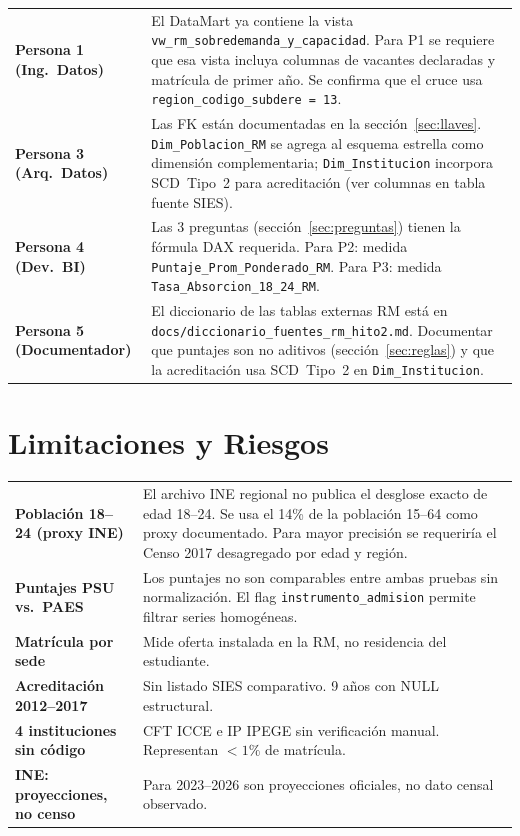 \documentclass[11pt,a4paper]{article}
\begin{document}
\begin{center}
\small
\begin{tabularx}{\textwidth}{@{}>{\bfseries}p{2.8cm}Y@{}}
\toprule
Persona 1 (Ing.\ Datos) &
  El DataMart ya contiene la vista \texttt{vw\_rm\_sobredemanda\_y\_capacidad}.
  Para P1 se requiere que esa vista incluya columnas de vacantes declaradas
  y matrícula de primer año. Se confirma que el cruce usa
  \texttt{region\_codigo\_subdere = 13}. \\
Persona 3 (Arq.\ Datos) &
  Las FK están documentadas en la sección~\ref{sec:llaves}.
  \texttt{Dim\_Poblacion\_RM} se agrega al esquema estrella como dimensión
  complementaria; \texttt{Dim\_Institucion} incorpora SCD~Tipo~2 para
  acreditación (ver columnas en tabla fuente SIES). \\
Persona 4 (Dev.\ BI) &
  Las 3 preguntas (sección~\ref{sec:preguntas}) tienen la fórmula DAX
  requerida. Para P2: medida \texttt{Puntaje\_Prom\_Ponderado\_RM}.
  Para P3: medida \texttt{Tasa\_Absorcion\_18\_24\_RM}. \\
Persona 5 (Documentador) &
  El diccionario de las tablas externas RM está en
  \texttt{docs/diccionario\_fuentes\_rm\_hito2.md}.
  Documentar que puntajes son no aditivos (sección~\ref{sec:reglas})
  y que la acreditación usa SCD~Tipo~2 en \texttt{Dim\_Institucion}. \\
\bottomrule
\end{tabularx}
\end{center}

\section{Limitaciones y Riesgos}
\label{sec:riesgos}

\begin{tabularx}{\textwidth}{@{}>{\bfseries}p{4.5cm}Y@{}}
\toprule
Población 18--24 (proxy INE) &
  El archivo INE regional no publica el desglose exacto de edad 18--24.
  Se usa el 14\% de la población 15--64 como proxy documentado.
  Para mayor precisión se requeriría el Censo 2017 desagregado por edad
  y región. \\
Puntajes PSU vs.\ PAES &
  Los puntajes no son comparables entre ambas pruebas sin normalización.
  El flag \texttt{instrumento\_admision} permite filtrar series homogéneas. \\
Matrícula por sede &
  Mide oferta instalada en la RM, no residencia del estudiante. \\
Acreditación 2012--2017 &
  Sin listado SIES comparativo. 9 años con NULL estructural. \\
4 instituciones sin código &
  CFT ICCE e IP IPEGE sin verificación manual. Representan $<1\%$
  de matrícula. \\
INE: proyecciones, no censo &
  Para 2023--2026 son proyecciones oficiales, no dato censal observado. \\
\bottomrule
\end{tabularx}
\end{document}
